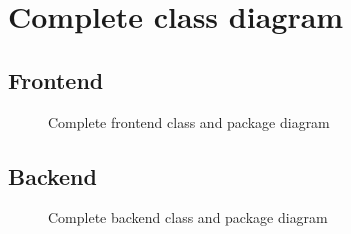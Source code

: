 \section{Complete class diagram}\label{appendix:complete-class-diagram}

\subsection*{Frontend}
\begin{figure}[!ht]
    \centering
    
    \caption{Complete frontend class and package diagram}
    \label{fig:frontend-complete}
\end{figure}

\subsection*{Backend}
\begin{figure}[!ht]
    \centering
    
    \caption{Complete backend class and package diagram}
    \label{fig:backend-complete}
\end{figure}